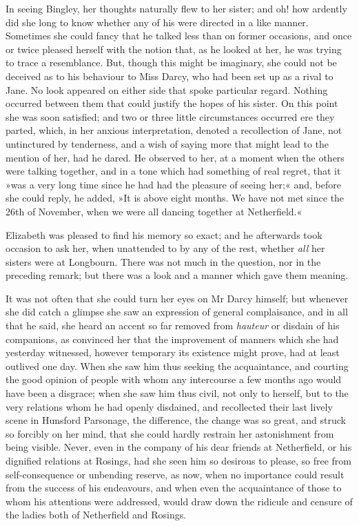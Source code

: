 In seeing Bingley, her thoughts naturally flew to her sister; and oh! how ardently did she long to know whether any of his were directed in a like manner. Sometimes she could fancy that he talked less than on former occasions, and once or twice pleased herself with the notion that, as he looked at her, he was trying to trace a resemblance. But, though this might be imaginary, she could not be deceived as to his behaviour to Miss Darcy, who had been set up as a rival to Jane. No look appeared on either side that spoke particular regard. Nothing occurred between them that could justify the hopes of his sister. On this point she was soon satisfied; and two or three little circumstances occurred ere they parted, which, in her anxious interpretation, denoted a recollection of Jane, not untinctured by tenderness, and a wish of saying more that might lead to the mention of her, had he dared. He observed to her, at a moment when the others were talking together, and in a tone which had something of real regret, that it »was a very long time since he had had the pleasure of seeing her;« and, before she could reply, he added, »It is above eight months. We have not met since the 26th of November, when we were all dancing together at Netherfield.«

Elizabeth was pleased to find his memory so exact; and he afterwards took occasion to ask her, when unattended to by any of the rest, whether \textit{all} her sisters were at Longbourn. There was not much in the question, nor in the preceding remark; but there was a look and a manner which gave them meaning.

It was not often that she could turn her eyes on Mr Darcy himself; but whenever she did catch a glimpse she saw an expression of general complaisance, and in all that he said, she heard an accent so far removed from \textit{hauteur} or disdain of his companions, as convinced her that the improvement of manners which she had yesterday witnessed, however temporary its existence might prove, had at least outlived one day. When she saw him thus seeking the acquaintance, and courting the good opinion of people with whom any intercourse a few months ago would have been a disgrace; when she saw him thus civil, not only to herself, but to the very relations whom he had openly disdained, and recollected their last lively scene in Hunsford Parsonage, the difference, the change was so great, and struck so forcibly on her mind, that she could hardly restrain her astonishment from being visible. Never, even in the company of his dear friends at Netherfield, or his dignified relations at Rosings, had she seen him so desirous to please, so free from self-consequence or unbending reserve, as now, when no importance could result from the success of his endeavours, and when even the acquaintance of those to whom his attentions were addressed, would draw down the ridicule and censure of the ladies both of Netherfield and Rosings.

